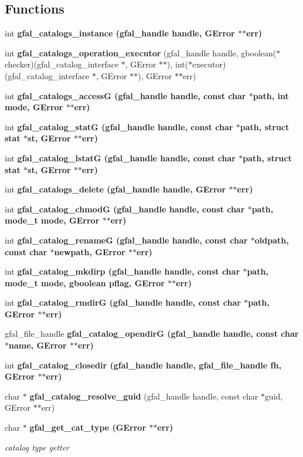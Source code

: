 \subsection*{Functions}
\begin{CompactItemize}
\item 
int \bf{gfal\_\-catalogs\_\-instance} (gfal\_\-handle handle, GError $\ast$$\ast$err)
\item 
int \textbf{gfal\_\-catalogs\_\-operation\_\-executor} (gfal\_\-handle handle, gboolean($\ast$checker)(gfal\_\-catalog\_\-interface $\ast$, GError $\ast$$\ast$), int($\ast$executor)(gfal\_\-catalog\_\-interface $\ast$, GError $\ast$$\ast$), GError $\ast$$\ast$err)\label{gfal__common__catalog_8c_50865ab5cba98b1c7e7f48d982120e3d}

\item 
int \bf{gfal\_\-catalogs\_\-access\-G} (gfal\_\-handle handle, const char $\ast$path, int mode, GError $\ast$$\ast$err)
\item 
int \bf{gfal\_\-catalog\_\-stat\-G} (gfal\_\-handle handle, const char $\ast$path, struct stat $\ast$st, GError $\ast$$\ast$err)
\item 
int \bf{gfal\_\-catalog\_\-lstat\-G} (gfal\_\-handle handle, const char $\ast$path, struct stat $\ast$st, GError $\ast$$\ast$err)
\item 
int \bf{gfal\_\-catalogs\_\-delete} (gfal\_\-handle handle, GError $\ast$$\ast$err)
\item 
int \bf{gfal\_\-catalog\_\-chmod\-G} (gfal\_\-handle handle, const char $\ast$path, mode\_\-t mode, GError $\ast$$\ast$err)
\item 
int \bf{gfal\_\-catalog\_\-rename\-G} (gfal\_\-handle handle, const char $\ast$oldpath, const char $\ast$newpath, GError $\ast$$\ast$err)
\item 
int \bf{gfal\_\-catalog\_\-mkdirp} (gfal\_\-handle handle, const char $\ast$path, mode\_\-t mode, gboolean pflag, GError $\ast$$\ast$err)
\item 
int \bf{gfal\_\-catalog\_\-rmdir\-G} (gfal\_\-handle handle, const char $\ast$path, GError $\ast$$\ast$err)
\item 
gfal\_\-file\_\-handle \bf{gfal\_\-catalog\_\-opendir\-G} (gfal\_\-handle handle, const char $\ast$name, GError $\ast$$\ast$err)
\item 
int \bf{gfal\_\-catalog\_\-closedir} (gfal\_\-handle handle, gfal\_\-file\_\-handle fh, GError $\ast$$\ast$err)
\item 
char $\ast$ \textbf{gfal\_\-catalog\_\-resolve\_\-guid} (gfal\_\-handle handle, const char $\ast$guid, GError $\ast$$\ast$err)\label{gfal__common__catalog_8c_4955825d7c275f3dfae9a57232642370}

\item 
char $\ast$ \bf{gfal\_\-get\_\-cat\_\-type} (GError $\ast$$\ast$err)
\begin{CompactList}\small\item\em catalog type getter \item\end{CompactList}\end{CompactItemize}


